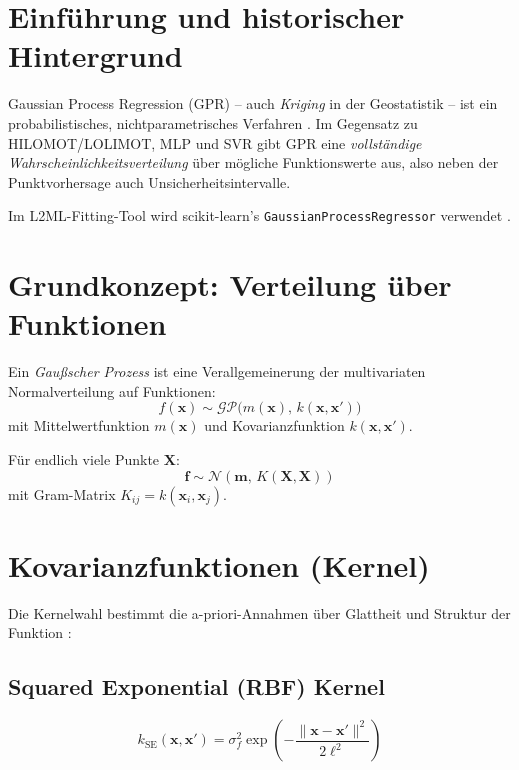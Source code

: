 \documentclass[11pt,a4paper]{report}
\begin{document}
\section{Einf\"{u}hrung und historischer Hintergrund}

Gaussian Process Regression (GPR) -- auch \emph{Kriging} in der Geostatistik -- ist ein
probabilistisches, nichtparametrisches Verfahren \cite{rasmussen2006}. Im Gegensatz zu
HILOMOT/LOLIMOT, MLP und SVR gibt GPR eine \emph{vollst\"{a}ndige Wahrscheinlichkeitsverteilung}
\"{u}ber m\"{o}gliche Funktionswerte aus, also neben der Punktvorhersage auch Unsicherheitsintervalle.

Im L2ML-Fitting-Tool wird scikit-learn's \texttt{GaussianProcessRegressor} verwendet \cite{sklearn_gpr, pedregosa2011}.

\section{Grundkonzept: Verteilung \"{u}ber Funktionen}

Ein \emph{Gau\ss{}scher Prozess} ist eine Verallgemeinerung der multivariaten Normalverteilung
auf Funktionen:
\begin{equation}
f(\mathbf{x}) \sim \mathcal{GP}\bigl(m(\mathbf{x}),\, k(\mathbf{x},\mathbf{x}')\bigr)
\label{eq:gp_prior}
\end{equation}
mit Mittelwertfunktion $m(\mathbf{x})$ und Kovarianzfunktion $k(\mathbf{x},\mathbf{x}')$.

F\"{u}r endlich viele Punkte $\mathbf{X}$:
\begin{equation}
\mathbf{f} \sim \mathcal{N}\!\left(\mathbf{m},\, K(\mathbf{X},\mathbf{X})\right)
\end{equation}
mit Gram-Matrix $K_{ij} = k(\mathbf{x}_i, \mathbf{x}_j)$.

\section{Kovarianzfunktionen (Kernel)}

Die Kernelwahl bestimmt die a-priori-Annahmen \"{u}ber Glattheit und Struktur der Funktion
\cite{rasmussen2006}:

\subsection{Squared Exponential (RBF) Kernel}

\begin{equation}
k_{\text{SE}}(\mathbf{x}, \mathbf{x}') = \sigma_f^2
\exp\!\left(-\frac{\lVert\mathbf{x}-\mathbf{x}'\rVert^2}{2\ell^2}\right)
\label{eq:se_kernel}
\end{equation}
\end{document}
